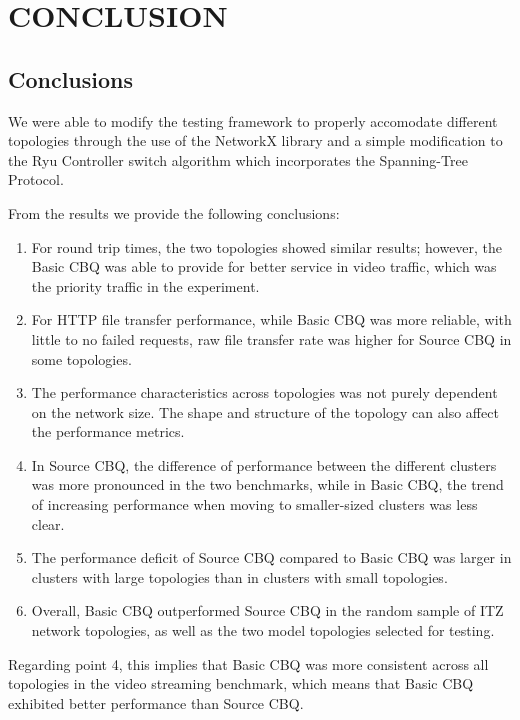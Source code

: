 \chapter{CONCLUSION}
\section{Conclusions}

We were able to modify the testing framework to properly accomodate different topologies through the use of the NetworkX library and a simple modification to the Ryu Controller switch algorithm which incorporates the Spanning-Tree Protocol.

From the results we provide the following conclusions:
\begin{enumerate}
    \item For round trip times, the two topologies showed similar results; however, the Basic CBQ was able to provide for better service in video traffic, which was the priority traffic in the experiment.
    \item For HTTP file transfer performance, while Basic CBQ was more reliable, with little to no failed requests, raw file transfer rate was higher for Source CBQ in some topologies. 
    \item The performance characteristics across topologies was not purely dependent on the network size. The shape and structure of the topology can also affect the performance metrics.
    \item In Source CBQ, the difference of performance between the different clusters was more pronounced in the two benchmarks, while in Basic CBQ, the trend of increasing performance when moving to smaller-sized clusters was less clear.
    \item The performance deficit of Source CBQ compared to Basic CBQ was larger in clusters with large topologies than in clusters with small topologies.
    \item Overall, Basic CBQ outperformed Source CBQ in the random sample of ITZ network topologies, as well as the two model topologies selected for testing. 
\end{enumerate}
Regarding point 4, this implies that Basic CBQ was more consistent across all topologies in the video streaming benchmark, which means that Basic CBQ exhibited better performance than Source CBQ.

